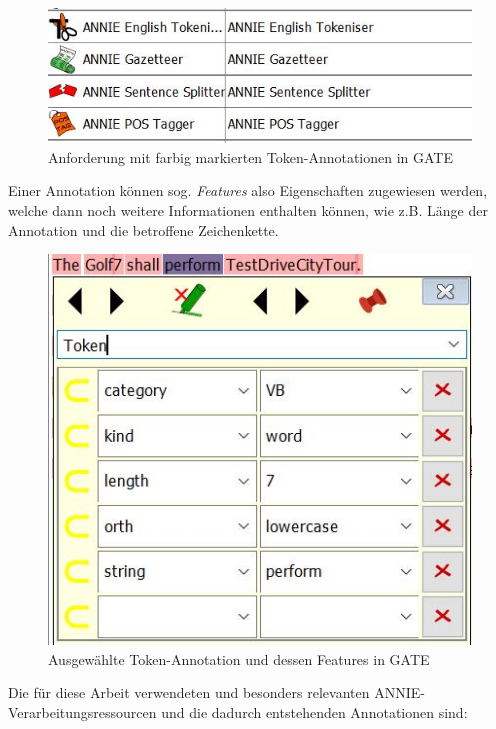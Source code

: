 \documentclass[12pt]{report}
\begin{document}
\begin{figure}[H]
\begin{center}
\includegraphics[scale=0.9]{Bilder/ANNIEinGATE.jpg}
\caption{Anforderung mit farbig markierten Token-Annotationen in GATE}
\end{center}
\end{figure}   

Einer Annotation können sog. \textit{Features} also Eigenschaften zugewiesen werden, welche dann noch weitere Informationen enthalten können, wie z.B. Länge der Annotation und die betroffene Zeichenkette.

\begin{figure}[H]
\begin{center}
\includegraphics[scale=0.9]{Bilder/FeaturesInGATE.jpg}
\caption{Ausgewählte Token-Annotation und dessen Features in GATE}
\end{center}
\end{figure}  

Die für diese Arbeit verwendeten und besonders relevanten ANNIE- Verarbeitungsressourcen und die dadurch entstehenden Annotationen sind: 
\end{document}
